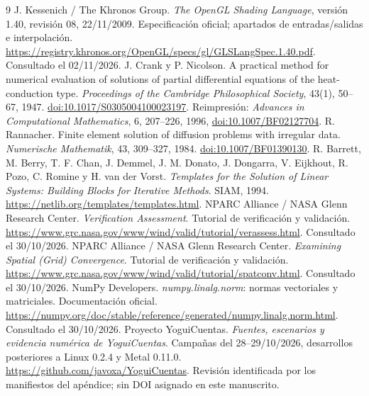 \documentclass[11pt,a4paper]{article}
\newcommand{\repo}{\url{https://github.com/javoxa/YoguiCuentas}}
\begin{document}
\clearpage
\begin{thebibliography}{9}
 J. Kessenich / The Khronos Group. \emph{The OpenGL Shading Language}, versión 1.40, revisión 08, 22/11/2009. Especificación oficial; apartados de entradas/salidas e interpolación. \url{https://registry.khronos.org/OpenGL/specs/gl/GLSLangSpec.1.40.pdf}. Consultado el 02/11/2026.
 J. Crank y P. Nicolson. A practical method for numerical evaluation of solutions of partial differential equations of the heat-conduction type. \emph{Proceedings of the Cambridge Philosophical Society}, 43(1), 50--67, 1947. \href{https://doi.org/10.1017/S0305004100023197}{doi:10.1017/S0305004100023197}. Reimpresión: \emph{Advances in Computational Mathematics}, 6, 207--226, 1996, \href{https://doi.org/10.1007/BF02127704}{doi:10.1007/BF02127704}.
 R. Rannacher. Finite element solution of diffusion problems with irregular data. \emph{Numerische Mathematik}, 43, 309--327, 1984. \href{https://doi.org/10.1007/BF01390130}{doi:10.1007/BF01390130}.
 R. Barrett, M. Berry, T. F. Chan, J. Demmel, J. M. Donato, J. Dongarra, V. Eijkhout, R. Pozo, C. Romine y H. van der Vorst. \emph{Templates for the Solution of Linear Systems: Building Blocks for Iterative Methods}. SIAM, 1994. \url{https://netlib.org/templates/templates.html}.
 NPARC Alliance / NASA Glenn Research Center. \emph{Verification Assessment}. Tutorial de verificación y validación. \url{https://www.grc.nasa.gov/www/wind/valid/tutorial/verassess.html}. Consultado el 30/10/2026.
 NPARC Alliance / NASA Glenn Research Center. \emph{Examining Spatial (Grid) Convergence}. Tutorial de verificación y validación. \url{https://www.grc.nasa.gov/www/wind/valid/tutorial/spatconv.html}. Consultado el 30/10/2026.
 NumPy Developers. \emph{numpy.linalg.norm}: normas vectoriales y matriciales. Documentación oficial. \url{https://numpy.org/doc/stable/reference/generated/numpy.linalg.norm.html}. Consultado el 30/10/2026.
 Proyecto YoguiCuentas. \emph{Fuentes, escenarios y evidencia numérica de YoguiCuentas}. Campañas del 28--29/10/2026, desarrollos posteriores a Linux 0.2.4 y Metal 0.11.0. \repo. Revisión identificada por los manifiestos del apéndice; sin DOI asignado en este manuscrito.
\end{thebibliography}
\end{document}
